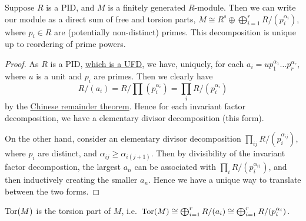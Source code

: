 \begin{theorem}\label{thm:structure-divisor}
    Suppose \(R\) is a PID,
    and \(M\) is a finitely generated \(R\)-module.
    Then we can write our module as a direct sum of free and torsion parts,
    \(M \cong R^s \oplus \bigoplus_{i=1}^r R/(p_i^{\alpha_i})\),
    where \(p_i \in R\) are (potentially non-distinct) primes.
    This decomposition is unique up to reordering of prime powers.
\end{theorem}
\begin{proof}
    As \(R\) is a PID, \hyperref[thm:pid-ufd]{which is a UFD},
    we have, uniquely, for each \(a_i = up_1^{\alpha_1} \hdots p_r^{\alpha_r}\),
    where \(u\) is a unit and \(p_i\) are primes.
    Then we clearly have
    \begin{equation*}
        R/(a_i) = R/\prod (p_i^{\alpha_i})
        = \prod_i R/(p_i^{\alpha_i})
    \end{equation*}
    by the \hyperref[thm:chinese]{Chinese remainder theorem}.
    Hence for each invariant factor decomposition,
    we have a elementary divisor decomposition (this form).

    On the other hand, consider an elementary divisor decomposition
    \(\prod_{ij} R/(p_i^{\alpha_{ij}})\), where \(p_i\) are distinct,
    and \(\alpha_{ij} \geq \alpha_{i(j+1)}\).
    Then by divisibility of the invariant factor decompostion,
    the largest \(a_n\) can be associated with \(\prod_i R/(p_i^{\alpha_{i1}})\),
    and then inductively creating the smaller \(a_n\).
    Hence we have a unique way to translate between the two forms.
\end{proof}

\begin{definition}
    \(\operatorname{Tor}(M)\) is the torsion part of \(M\),
    i.e.\ \(\operatorname{Tor}(M) \cong \bigoplus_{i=1}^r R/(a_i) \cong \bigoplus_{i=1}^r R/(p_i^{\alpha_i})\).
\end{definition}

